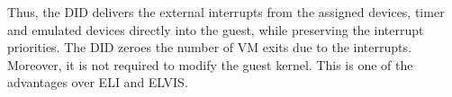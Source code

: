 Thus, the DID delivers the external interrupts from the
assigned devices, timer and emulated devices directly into the
guest, while preserving the interrupt priorities. The DID
zeroes the number of VM exits due to the interrupts. Moreover,
it is not required to modify the guest kernel. This is one of
the advantages over ELI and ELVIS.
